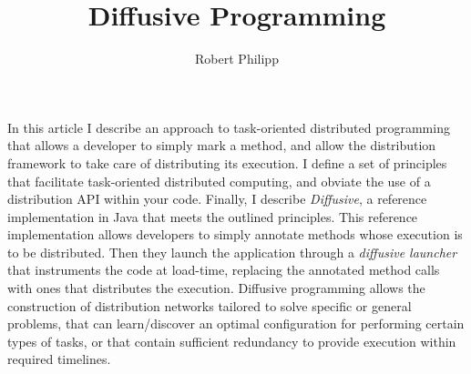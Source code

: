 \documentclass[11pt]{amsart}
\title{Diffusive Programming}
\author{Robert Philipp}
\date{}                                           %
\begin{document}
\maketitle

In this article I describe an approach to task-oriented distributed programming that allows a developer to simply mark a method, and allow the distribution framework to take care of distributing its execution. I define a set of principles that facilitate task-oriented distributed computing, and obviate the use of a distribution API within your code. Finally, I describe \emph{Diffusive}, a reference implementation in Java that meets the outlined principles. This reference implementation allows developers to simply annotate methods whose execution is to be distributed. Then they launch the application through a \emph{diffusive launcher} that instruments the code at load-time, replacing the annotated method calls with ones that distributes the execution. Diffusive programming allows the construction of distribution networks tailored to solve specific or general problems, that can learn/discover an optimal configuration for performing certain types of tasks, or that contain sufficient redundancy to provide execution within required timelines.
\end{document}
